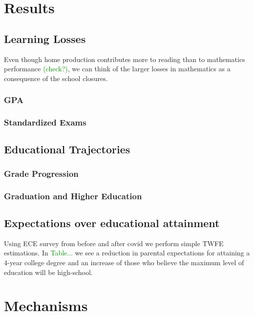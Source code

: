 \section{Results}\label{sec:results}

\subsection{Learning Losses}

Even though home production contributes more to reading than to mathematics performance \cite{black_recent_2010} \textcolor{green}{(check?)}, we can think of the larger losses in mathematics as a consequence of the school closures.

\subsubsection{GPA}

\subsubsection{Standardized Exams}

\subsection{Educational Trajectories}

\subsubsection{Grade Progression}

\subsubsection{Graduation and Higher Education}

\subsection{Expectations over educational attainment}

Using ECE survey from before and after covid we perform simple TWFE estimations. In \textcolor{green}{Table...} we see a reduction in parental expectations for attaining a 4-year college degree and an increase of those who believe the maximum level of education will be high-school.


\section{Mechanisms}\label{sec:mechanisms}


